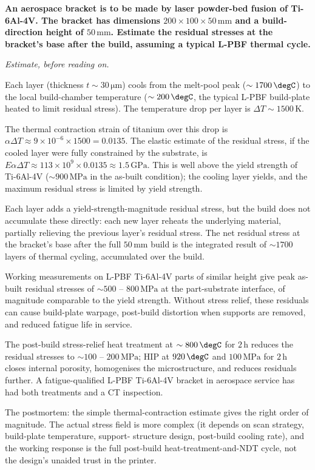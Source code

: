 \begin{estimation}
\textbf{An aerospace bracket is to be made by laser powder-bed fusion
of Ti-6Al-4V. The bracket has dimensions $200 \times 100 \times 50\,
\text{mm}$ and a build-direction height of $50\,\text{mm}$. Estimate
the residual stresses at the bracket's base after the build,
assuming a typical L-PBF thermal cycle.}

\smallskip
\textit{Estimate, before reading on.}

\smallskip
Each layer (thickness $t \sim 30\,\si{\micro\meter}$) cools from the
melt-pool peak ($\sim 1700\,\degC$) to the local build-chamber
temperature ($\sim 200\,\degC$, the typical L-PBF build-plate heated
to limit residual stress). The temperature drop per layer is $\Delta T
\sim 1500\,\si{\kelvin}$.

The thermal contraction strain of titanium over this drop is $\alpha
\Delta T \approx 9 \times 10^{-6} \times 1500 = 0.0135$. The elastic
estimate of the residual stress, if the cooled layer were fully
constrained by the substrate, is $E \alpha \Delta T \approx 113 \times
10^9 \times 0.0135 \approx 1.5\,\text{GPa}$. This is well above the
yield strength of Ti-6Al-4V ($\sim 900\,\text{MPa}$ in the
as-built condition); the cooling layer yields, and the maximum
residual stress is limited by yield strength.

Each layer adds a yield-strength-magnitude residual stress, but the
build does not accumulate these directly: each new layer reheats the
underlying material, partially relieving the previous layer's residual
stress. The net residual stress at the bracket's base after the full
$50\,\text{mm}$ build is the integrated result of $\sim 1700$ layers
of thermal cycling, accumulated over the build.

Working measurements on L-PBF Ti-6Al-4V parts of similar height give
peak as-built residual stresses of $\sim 500$ -- $800\,\text{MPa}$
at the part-substrate interface, of magnitude comparable to the
yield strength. Without stress relief, these residuals can cause
build-plate warpage, post-build distortion when supports are removed,
and reduced fatigue life in service.

The post-build stress-relief heat treatment at $\sim 800\,\degC$ for
$2\,\text{h}$ reduces the residual stresses to $\sim 100$ -- $200\,\text{MPa}$;
HIP at $920\,\degC$ and $100\,\text{MPa}$ for $2\,\text{h}$ closes
internal porosity, homogenises the microstructure, and reduces
residuals further. A fatigue-qualified L-PBF Ti-6Al-4V bracket in
aerospace service has had both treatments and a CT inspection.

The postmortem: the simple thermal-contraction estimate gives the
right order of magnitude. The actual stress field is more complex
(it depends on scan strategy, build-plate temperature, support-
structure design, post-build cooling rate), and the working response
is the full post-build heat-treatment-and-NDT cycle, not the design's
unaided trust in the printer.
\end{estimation}

